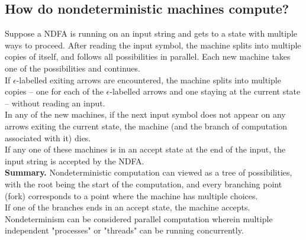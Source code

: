 \documentclass{article}
\begin{document}
\subsection{How do nondeterministic machines compute?}
Suppose a NDFA is running on an input string and gets to a state with multiple ways to proceed. After reading the input symbol, the machine splits into multiple copies of itself, and follows all possibilities in parallel. Each new machine takes one of the possibilities and continues.\medskip
\\ If $\epsilon$-labelled exiting arrows are encountered, the machine splits into multiple copies -- one for each of the $\epsilon$-labelled arrows and one staying at the current state -- without reading an input.\medskip
\\ In any of the new machines, if the next input symbol does not appear on any arrows exiting the current state, the machine (and the branch of computation associated with it) dies.\medskip
\\ If any one of these machines is in an accept state at the end of the input, the input string is accepted by the NDFA.\medskip
\\\textbf{Summary.} Nondeterministic computation can viewed as a tree of possibilities, with the root being the start of the computation, and every branching point (fork) corresponds to a point where the machine has multiple choices.\medskip
\\ If one of the branches ends in an accept state, the machine accepts.\medskip
\\Nondeterminism can be considered parallel computation wherein multiple independent "processes" or "threads" can be running concurrently.
\end{document}
